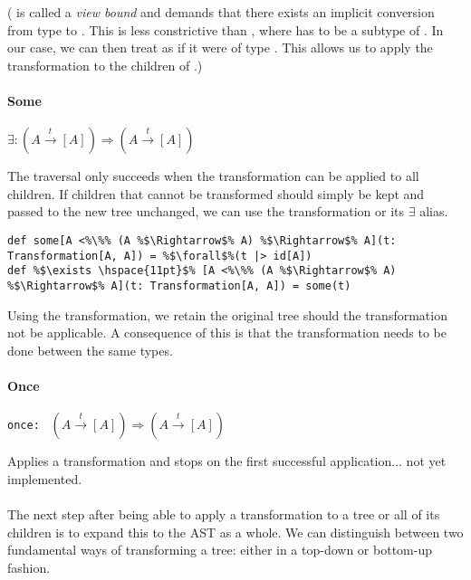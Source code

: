 \documentclass[10pt,a4paper,oneside]{scrreprt}
\begin{document}
( is called a \textit{view bound} and demands that there exists an implicit conversion from type  to . This is less constrictive than , where  has to be a subtype of . In our case, we can then treat  as if it were of type . This allows us to apply the transformation to the children of .)

\paragraph{Some} \hfill $\exists: (A \overset{t}{\rightarrow} [A]) \Rightarrow (A \overset{t}{\rightarrow} [A])$

\vspace{7pt} The  traversal only succeeds when the transformation can be applied to all children. If children that cannot be transformed should simply be kept and passed to the new tree unchanged, we can use the  transformation or its $\exists$ alias.

\begin{lstlisting}
def some[A <%\%% (A %$\Rightarrow$% A) %$\Rightarrow$% A](t: Transformation[A, A]) = %$\forall$%(t |> id[A])
def %$\exists \hspace{11pt}$% [A <%\%% (A %$\Rightarrow$% A) %$\Rightarrow$% A](t: Transformation[A, A]) = some(t)
\end{lstlisting}

Using the  transformation, we retain the original tree should the transformation not be applicable. A consequence of this is that the transformation needs to be done between the same types.

\paragraph{Once} \hfill \lstinline{once: } $(A \overset{t}{\rightarrow} [A]) \Rightarrow (A \overset{t}{\rightarrow} [A])$

\vspace{7pt} Applies a transformation and stops on the first successful application... not yet implemented.
\\\\
The next step after being able to apply a transformation to a tree or all of its children is to expand this to the AST as a whole. We can distinguish between two fundamental ways of transforming a tree: either in a top-down or bottom-up fashion.
\end{document}
